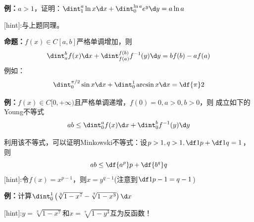 {\bf 例：}$a>1$，证明：$\dint_1^a\ln x\d x+\dint_0^{\ln a}e^y\d y=a\ln a$

[hint]:与上题同理。

{\bf 命题：}$f(x)\in C[a,b]$严格单调增加，则
$$\dint_a^bf(x)\d x+\dint_{f(a)}^{f(b)}f^{-1}(y)\d y=bf(b)-af(a)$$
例如：
$$\dint_0^{\pi/2}\sin x\d x+\dint_0^1\arcsin x\d x=\df{\pi}2$$
\begin{center}
\end{center}

{\bf 例：}$f(x)\in C[0,+\infty)$且严格单调递增，$f(0)=0,a>0,b>0$，则
成立如下的Young不等式
$$ab\leq\dint_0^af(x)\d x+\dint_0^bf^{-1}(y)\d y$$
\begin{center}
\end{center}
利用该不等式，可以证明Minkowski不等式：设$p>1,q>1,\df1p+\df1q=1$，则
$$ab\leq\df{a^p}p+\df{b^q}q$$
[hint]:令$f(x)=x^{p-1}$，则$x=y^{q-1}$(注意到$\df1{p-1}=q-1$)

{\bf 例：}计算$\dint_0^1\left(\sqrt[3]{1-x^7}-\sqrt[7]{1-x^3}\right)\d x$

[hint]:$y=\sqrt[3]{1-x^7}$和$x=\sqrt[7]{1-y^3}$互为反函数！

